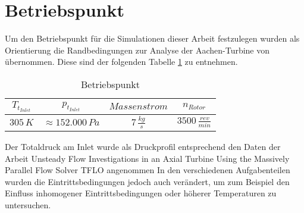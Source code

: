 \section{Betriebspunkt}
\label{subsec:aachensetup}
Um den Betriebspunkt für die Simulationen dieser Arbeit festzulegen wurden als Orientierung die Randbedingungen zur Analyse der Aachen-Turbine von 
\cite{ufi2001YaoDavis}
übernommen. Diese sind der folgenden Tabelle \ref{tab:aachensetup} zu entnehmen.
\begin{table}[H]
\centering
\label{tab:aachensetup}
\caption{Betriebspunkt}
\begin{tabular}{ c| c| c| c}
$T_{t_{Inlet}}$&$p_{t_{Inlet}}$&$Massenstrom$&$n_{Rotor}$\\
\hline
$305 \, K$&$\approx152.000 \, Pa$&$7 \, \frac{kg}{s}$&$3500 \, \frac{rev}{min}$\\
\end{tabular}
\end{table}
Der Totaldruck am Inlet wurde als Druckprofil entsprechend den Daten der Arbeit \glqq Unsteady Flow Investigations in an
Axial Turbine Using the Massively
Parallel Flow Solver TFLO\grqq \cite[p. 4]{ufi2001YaoDavis} angenommen
In den verschiedenen Aufgabenteilen wurden die Eintrittsbedingungen jedoch auch verändert, um zum Beispiel den Einfluss inhomogener Eintrittsbedingungen oder höherer Temperaturen zu untersuchen.






